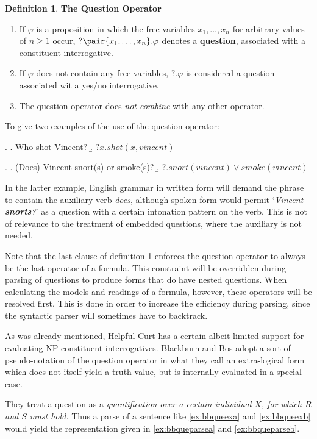 \documentclass[a4paper]{article}
\newcommand{\stress}{\textbf} %
\newcommand{\term}[1]{\textsf{\textbf{#1}}} %
\newcommand{\pn}{\textsf} %
\newcommand{\example}[1]{`\textit{#1}'} %
\theoremstyle{remark}
\theoremstyle{remark}
\theoremstyle{definition}
\newtheorem{definition}[thm]{Definition}
\theoremstyle{definition}
\begin{document}
\begin{definition}\label{def:qop}
  \stress{The Question Operator}
  \begin{enumerate}
    \item If $\varphi$ is a proposition in which the free variables
    $x_1,\ldots,x_n$ for arbitrary values of $n \geq 1$ occur,
    $?\pair{x_1,\ldots,x_n}.\varphi$ denotes a \term{question}, associated with
    a constituent interrogative.
    \item If $\varphi$ does not contain any free variables, $?.\varphi$ is
    considered a question associated wit a yes/no interrogative.
    \item \label{def:outermost}The question operator does \emph{not combine} with any other operator.
  \end{enumerate}
\end{definition}

To give two examples of the use of the question operator:

\ex. \a. Who shot Vincent?
\b. $?x.shot(x,vincent)$

\ex. \a. (Does) Vincent snort(s) or smoke(s)?
\b. $?.snort(vincent) \vee smoke(vincent)$

In the latter example, English grammar in written form will demand the phrase to
contain the auxiliary verb \emph{does}, although spoken form would permit
\example{Vincent \stress{snorts}?} as a question with a certain intonation
pattern on the verb. This is not of relevance to the treatment of embedded
questions, where the auxiliary is not needed.

Note that the last clause of definition \ref{def:qop} enforces the question operator to
always be the last operator of a formula. This constraint will be overridden
during parsing of questions to produce forms that do have nested questions.
When calculating the models and readings of a formula, however, these operators
will be resolved first. This is done in order to increase the efficiency during
parsing, since the syntactic parser will sometimes have to backtrack.

As was already mentioned, \pn{Helpful Curt} has a certain albeit limited
support for evaluating NP constituent interrogatives. Blackburn and Bos adopt a
sort of pseudo-notation of the question operator in what they call an
extra-logical form which does not itself yield a truth value, but is
internally evaluated in a special case.

They treat a question as a \emph{quantification
over a certain individual $X$, for which $R$ and $S$ must hold.} Thus a parse of
a sentence like \ref{ex:bbqueexa} and \ref{ex:bbqueexb} would yield the representation given in
\ref{ex:bbqueparsea} and \ref{ex:bbqueparseb}.
\end{document}
